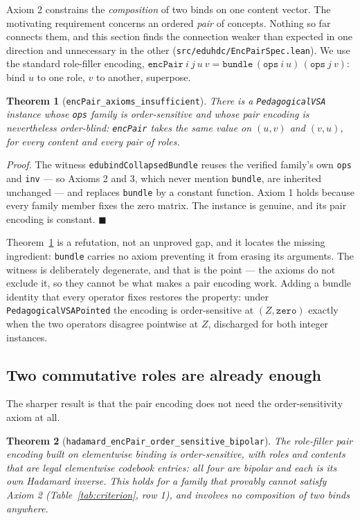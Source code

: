 \documentclass[10pt]{article}
\newtheorem{theorem}{Theorem}[section]
\begin{document}
Axiom 2 constrains the \emph{composition} of two binds on one content vector. The motivating requirement concerns an ordered \emph{pair} of concepts. Nothing so far connects them, and this section finds the connection weaker than expected in one direction and unnecessary in the other (\texttt{src/eduhdc/\allowbreak EncPairSpec.lean}). We use the standard role-filler encoding, $\texttt{encPair}\ i\ j\ u\ v = \texttt{bundle}\,(\texttt{ops}\ i\ u)\,(\texttt{ops}\ j\ v)$: bind $u$ to one role, $v$ to another, superpose.

\begin{theorem}[\texttt{encPair\_axioms\_insufficient}]
\label{thm:insufficient}
There is a \texttt{PedagogicalVSA} instance whose \texttt{ops} family is order-sensitive and whose pair encoding is nevertheless order-blind: \texttt{encPair} takes the same value on $(u,v)$ and $(v,u)$, for every content and every pair of roles.
\end{theorem}

\emph{Proof.} The witness \texttt{edubindCollapsedBundle} reuses the verified family's own \texttt{ops} and \texttt{inv} --- so Axioms 2 and 3, which never mention \texttt{bundle}, are inherited unchanged --- and replaces \texttt{bundle} by a constant function. Axiom 1 holds because every family member fixes the zero matrix. The instance is genuine, and its pair encoding is constant. $\blacksquare$

Theorem~\ref{thm:insufficient} is a refutation, not an unproved gap, and it locates the missing ingredient: \texttt{bundle} carries no axiom preventing it from erasing its arguments. The witness is deliberately degenerate, and that is the point --- the axioms do not exclude it, so they cannot be what makes a pair encoding work. Adding a bundle identity that every operator fixes restores the property: under \texttt{PedagogicalVSAPointed} the encoding is order-sensitive at $(Z, \texttt{zero})$ exactly when the two operators disagree pointwise at $Z$, discharged for both integer instances.

\subsection{Two commutative roles are already enough}
\label{sec:h0}

The sharper result is that the pair encoding does not need the order-sensitivity axiom at all.

\begin{theorem}[\texttt{hadamard\_encPair\_order\_sensitive\_bipolar}]
\label{thm:h0}
The role-filler pair encoding built on elementwise binding is order-sensitive, with roles and contents that are \emph{legal elementwise codebook entries}: all four are bipolar and each is its own Hadamard inverse. This holds for a family that provably cannot satisfy Axiom 2 (Table~\ref{tab:criterion}, row 1), and involves no composition of two binds anywhere.
\end{theorem}
\end{document}
